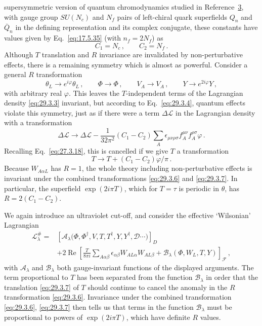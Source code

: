 supersymmetric version of quantum chromodynamics studied in
Reference~\hyperref[ch29-ref-3]{3}, with gauge group \(SU(N_c)\) and
\(N_f\) pairs of left-chiral quark superfields \(Q_n\) and \(\bar Q_n\)
in the defining representation and its complex conjugate, these constants
have values given by Eq.~\eqref{eq:17.5.35} (with \(n_f=2N_f\)) as
\[
  C_1=N_c\,,
  \qquad
  C_2=N_f\,.
\]
Although \(T\) translation and \(R\) invariance are invalidated by
non-perturbative effects, there is a remaining symmetry which is almost as
powerful. Consider a general \(R\) transformation
\begin{equation}
  \theta_L\longrightarrow e^{i\varphi}\theta_L\,,
  \qquad
  \Phi\longrightarrow\Phi\,,
  \qquad
  V_A\longrightarrow V_A\,,
  \qquad
  Y\longrightarrow e^{2i\varphi}Y\,,
  \tag{29.3.6}\label{eq:29.3.6}
\end{equation}
with arbitrary real \(\varphi\). This leaves the \(T\)-independent terms
of the Lagrangian density \eqref{eq:29.3.3} invariant, but according to
Eq.~\eqref{eq:29.3.4}, quantum effects violate this symmetry, just as if
there were a term \(\Delta\mathcal{L}\) in the Lagrangian density with a
transformation
\[
  \Delta\mathcal{L}
  \longrightarrow
  \Delta\mathcal{L}
  -\frac{1}{32\pi^2}(C_1-C_2)
  \sum_A\epsilon_{\mu\nu\rho\sigma}
  f_A^{\mu\nu}f_A^{\rho\sigma}\varphi\,.
\]
Recalling Eq.~\eqref{eq:27.3.18}, this is cancelled if we give \(T\) a
transformation
\begin{equation}
  T\longrightarrow T+(C_1-C_2)\varphi/\pi\,.
  \tag{29.3.7}\label{eq:29.3.7}
\end{equation}
Because \(W_{A\alpha L}\) has \(R=1\), the whole theory including
non-perturbative effects is invariant under the combined transformations
\eqref{eq:29.3.6} and \eqref{eq:29.3.7}. In particular, the superfield
\(\exp(2i\pi T)\), which for \(T=\tau\) is periodic in \(\theta\), has
\(R=2(C_1-C_2)\).

We again introduce an ultraviolet cut-off, and consider the effective
`Wilsonian' Lagrangian
\begin{equation}
  \begin{aligned}
  \mathcal{L}^{\#}_\lambda
  ={}&
  \left[
    \mathcal{A}_\lambda
    \bigl(\Phi,\Phi^\dagger,V,T,T^\dagger,Y,Y^\dagger,
    \mathcal{D}\cdots\bigr)
  \right]_D
  \\
  &+2\operatorname{Re}
  \left[
    \frac{T}{8\pi i}
    \sum_{A\alpha\beta}
    \epsilon_{\alpha\beta}W_{AL\alpha}W_{AL\beta}
    +\mathcal{B}_\lambda(\Phi,W_L,T,Y)
  \right]_{\mathcal{F}}\,,
  \end{aligned}
  \tag{29.3.8}\label{eq:29.3.8}
\end{equation}
with \(\mathcal{A}_\lambda\) and \(\mathcal{B}_\lambda\) both
gauge-invariant functions of the displayed arguments. The term
proportional to \(T\) has been separated from the function
\(\mathcal{B}_\lambda\) in order that the translation
\eqref{eq:29.3.7} of \(T\) should continue to cancel the anomaly in the
\(R\) transformation \eqref{eq:29.3.6}. Invariance under the combined
transformation \eqref{eq:29.3.6}, \eqref{eq:29.3.7} then tells us that
terms in the function \(\mathcal{B}_\lambda\) must be proportional to
powers of \(\exp(2i\pi T)\), which have definite \(R\) values.

